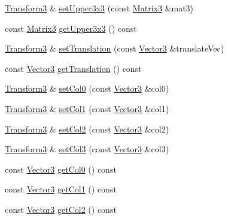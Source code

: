 \begin{DoxyCompactItemize}
\item 
\hyperlink{classVectormath_1_1Aos_1_1Transform3}{Transform3} \& \hyperlink{classVectormath_1_1Aos_1_1Transform3_abe5cd8955f4333ebe26b29b2cd675399}{set\-Upper3x3} (const \hyperlink{classVectormath_1_1Aos_1_1Matrix3}{Matrix3} \&mat3)
\item 
const \hyperlink{classVectormath_1_1Aos_1_1Matrix3}{Matrix3} \hyperlink{classVectormath_1_1Aos_1_1Transform3_a06797b4731acac19f070b886253b435b}{get\-Upper3x3} () const 
\item 
\hyperlink{classVectormath_1_1Aos_1_1Transform3}{Transform3} \& \hyperlink{classVectormath_1_1Aos_1_1Transform3_a6c55ac4d2ffea34ef6aa5d3dea3768ce}{set\-Translation} (const \hyperlink{classVectormath_1_1Aos_1_1Vector3}{Vector3} \&translate\-Vec)
\item 
const \hyperlink{classVectormath_1_1Aos_1_1Vector3}{Vector3} \hyperlink{classVectormath_1_1Aos_1_1Transform3_ab4fbda61a2b91bb826066bf384a94cd0}{get\-Translation} () const 
\item 
\hyperlink{classVectormath_1_1Aos_1_1Transform3}{Transform3} \& \hyperlink{classVectormath_1_1Aos_1_1Transform3_a379d1863457b97607424c7d7036bf1eb}{set\-Col0} (const \hyperlink{classVectormath_1_1Aos_1_1Vector3}{Vector3} \&col0)
\item 
\hyperlink{classVectormath_1_1Aos_1_1Transform3}{Transform3} \& \hyperlink{classVectormath_1_1Aos_1_1Transform3_a974966028c02f19ad2c63fa182153b30}{set\-Col1} (const \hyperlink{classVectormath_1_1Aos_1_1Vector3}{Vector3} \&col1)
\item 
\hyperlink{classVectormath_1_1Aos_1_1Transform3}{Transform3} \& \hyperlink{classVectormath_1_1Aos_1_1Transform3_a8d9bd044ef5de78704566cf12a0fd9a6}{set\-Col2} (const \hyperlink{classVectormath_1_1Aos_1_1Vector3}{Vector3} \&col2)
\item 
\hyperlink{classVectormath_1_1Aos_1_1Transform3}{Transform3} \& \hyperlink{classVectormath_1_1Aos_1_1Transform3_a4bbefd547e301601b7f6c37371509952}{set\-Col3} (const \hyperlink{classVectormath_1_1Aos_1_1Vector3}{Vector3} \&col3)
\item 
const \hyperlink{classVectormath_1_1Aos_1_1Vector3}{Vector3} \hyperlink{classVectormath_1_1Aos_1_1Transform3_af0beb2dbbc0c9b21c50c092c7a00219d}{get\-Col0} () const 
\item 
const \hyperlink{classVectormath_1_1Aos_1_1Vector3}{Vector3} \hyperlink{classVectormath_1_1Aos_1_1Transform3_a599e8e829f4da3ca98f5e6ec37bc245a}{get\-Col1} () const 
\item 
const \hyperlink{classVectormath_1_1Aos_1_1Vector3}{Vector3} \hyperlink{classVectormath_1_1Aos_1_1Transform3_a2456a9c9a3928065c156d327fca3bfcd}{get\-Col2} () const 

\end{DoxyCompactItemize}

